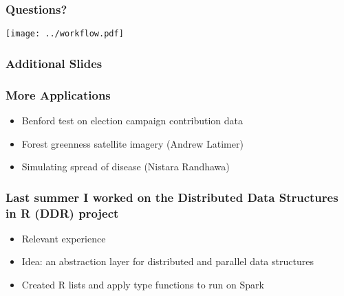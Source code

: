 \documentclass{beamer}
\begin{document}
\begin{frame}

    \frametitle{Questions?}
    \centerline{\texttt{[image: ../workflow.pdf]}}

\end{frame}
\begin{frame}

    \frametitle{Additional Slides}

\end{frame}
\begin{frame}

    \frametitle{More Applications}


\begin{itemize}
    \item Benford test on election campaign contribution data
    \item Forest greenness satellite imagery (Andrew Latimer)
    \item Simulating spread of disease (Nistara Randhawa)
\end{itemize}

\end{frame}
\begin{frame}

    \frametitle{Last summer I worked on the Distributed Data Structures in
R (DDR) project}


\begin{itemize}
    \item Relevant experience
    \item Idea: an abstraction layer for distributed and parallel data structures
    \item Created R lists and apply type functions to run on Spark
\end{itemize}


\end{frame}
\end{document}
